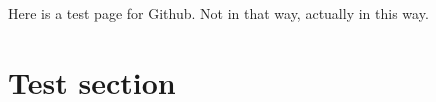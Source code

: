 \documentclass{article}
\begin{document}
Here is a test page for Github. Not in that way, actually in this way.

\section{Test section}
\end{document}
